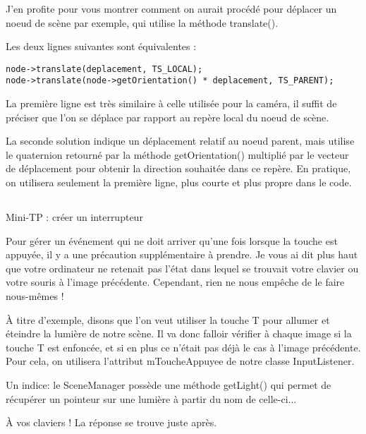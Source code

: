 J'en profite pour vous montrer comment on aurait proc\'ed\'e pour d\'eplacer un noeud de sc\`ene par exemple, qui utilise la m\'ethode translate().

Les deux lignes suivantes sont \'equivalentes :


\begin{lstlisting}[caption={}]
node->translate(deplacement, TS_LOCAL);
node->translate(node->getOrientation() * deplacement, TS_PARENT);
\end{lstlisting}


La premi\`ere ligne est tr\`es similaire \`a celle utilis\'ee pour la cam\'era, il suffit de pr\'eciser que l'on se d\'eplace par rapport au rep\`ere local du noeud de sc\`ene.

La seconde solution indique un d\'eplacement relatif au noeud parent, mais utilise le quaternion retourn\'e par la m\'ethode getOrientation() multipli\'e par le vecteur de d\'eplacement pour obtenir la direction souhait\'ee dans ce rep\`ere. En pratique, on utilisera seulement la premi\`ere ligne, plus courte et plus propre dans le code.







\subsection{}
Mini-TP : cr\'eer un interrupteur

Pour g\'erer un \'ev\'enement qui ne doit arriver qu'une fois lorsque la touche est appuy\'ee, il y a une pr\'ecaution suppl\'ementaire \`a prendre. Je vous ai dit plus haut que votre ordinateur ne retenait pas l'\'etat dans lequel se trouvait votre clavier ou votre souris \`a l'image pr\'ec\'edente. Cependant, rien ne nous emp\^eche de le faire nous-m\^emes !

\`A titre d'exemple, disons que l'on veut utiliser la touche T pour allumer et \'eteindre la lumi\`ere de notre sc\`ene. Il va donc falloir v\'erifier \`a chaque image si la touche T est enfonc\'ee, et si en plus ce n'\'etait pas d\'ej\`a le cas \`a l'image pr\'ec\'edente. Pour cela, on utilisera l'attribut mToucheAppuyee de notre classe InputListener.

Un indice: le SceneManager poss\`ede une m\'ethode getLight() qui permet de r\'ecup\'erer un pointeur sur une lumi\`ere \`a partir du nom de celle-ci...

\`A vos claviers ! La r\'eponse se trouve juste apr\`es.



